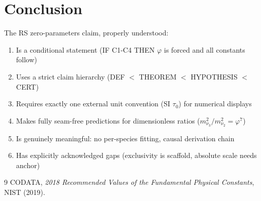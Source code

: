 \documentclass[12pt,a4paper]{article}
\theoremstyle{definition}
\theoremstyle{remark}
\begin{document}
\section{Conclusion}

The RS zero-parameters claim, properly understood:
\begin{enumerate}
\item Is a conditional statement (IF C1-C4 THEN $\varphi$ is forced and all constants follow)
\item Uses a strict claim hierarchy (DEF $<$ THEOREM $<$ HYPOTHESIS $<$ CERT)
\item Requires exactly one external unit convention (SI $\tau_0$) for numerical displays
\item Makes fully seam-free predictions for dimensionless ratios ($m_{\nu_3}^2/m_{\nu_2}^2 = \varphi^7$)
\item Is genuinely meaningful: no per-species fitting, causal derivation chain
\item Has explicitly acknowledged gaps (exclusivity is scaffold, absolute scale needs anchor)
\end{enumerate}

\begin{thebibliography}{9}
 CODATA, \emph{2018 Recommended Values of the Fundamental Physical Constants}, 
NIST (2019).
\end{thebibliography}
\end{document}
